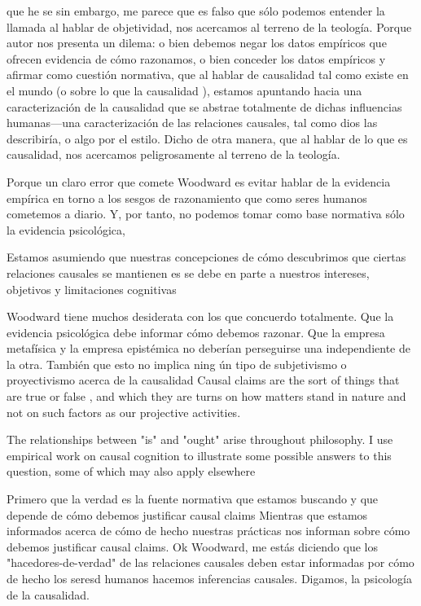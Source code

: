 que he se sin embargo, me parece que es falso que sólo podemos
entender la llamada  al hablar de
objetividad, nos acercamos al terreno de la teología. Porque
autor nos presenta un dilema: o bien debemos negar los datos
empíricos que ofrecen evidencia de cómo razonamos, o bien
conceder los datos empíricos y afirmar como cuestión
normativa, que al hablar de causalidad tal como existe en el
mundo (o sobre lo que la causalidad ), estamos
apuntando hacia una caracterización de la causalidad que se
abstrae totalmente de dichas influencias humanas---una
caracterización de las relaciones causales, tal como dios
las describiría, o algo por el estilo. Dicho de otra manera, 
que al hablar de lo que es causalidad, nos acercamos
peligrosamente al terreno de la teología. 

Porque un claro error que comete Woodward es evitar hablar
de la evidencia empírica en torno a los sesgos de
razonamiento que como seres humanos cometemos a diario. Y,
por tanto, no podemos tomar como base normativa sólo la
evidencia psicológica, 

Estamos asumiendo que nuestras concepciones de cómo
descubrimos que ciertas relaciones causales se mantienen es
se debe en parte a nuestros intereses, objetivos y
limitaciones cognitivas

Woodward tiene muchos desiderata con los que concuerdo
totalmente. Que la evidencia psicológica debe informar cómo
debemos razonar. Que la empresa metafísica y la empresa
epistémica no deberían perseguirse una independiente de la
otra. También que esto no implica ning ún tipo de
subjetivismo o proyectivismo acerca de la causalidad
Causal claims are the sort of things that are true or false
, and which they are turns on how matters stand in nature
and not on such factors as our projective activities. 

The relationships between "is" and "ought" arise throughout
philosophy. I use empirical work on causal cognition to
illustrate some possible answers to this question, some of
which may also apply elsewhere

Primero que la verdad es la fuente normativa que estamos
buscando y que depende de cómo debemos justificar causal
claims Mientras que estamos informados acerca de cómo de
hecho nuestras prácticas nos informan sobre cómo debemos
justificar causal claims. Ok Woodward, me estás diciendo que
los "hacedores-de-verdad" de las relaciones causales deben
estar informadas por cómo de hecho los seresd humanos
hacemos inferencias causales. Digamos, la psicología de la
causalidad. 





